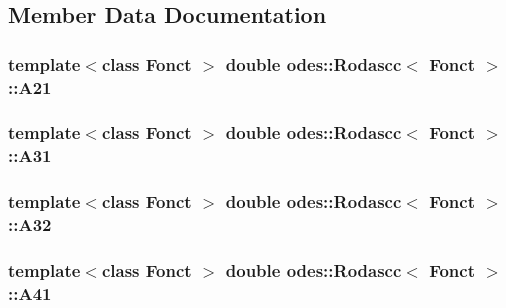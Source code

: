 \subsection{Member Data Documentation}
\hypertarget{classodes_1_1Rodascc_a4d691a75b627e591251a32608a6909df}{
\subsubsection[{A21}]{\setlength{\rightskip}{0pt plus 5cm}template$<$class Fonct $>$ double {\bf odes\-::\-Rodascc}$<$ Fonct $>$\-::A21\hspace{0.3cm}{\ttfamily [private]}}}\label{classodes_1_1Rodascc_a4d691a75b627e591251a32608a6909df}
\hypertarget{classodes_1_1Rodascc_a362aebc9995ecb57983aca35d05c89c1}{
\subsubsection[{A31}]{\setlength{\rightskip}{0pt plus 5cm}template$<$class Fonct $>$ double {\bf odes\-::\-Rodascc}$<$ Fonct $>$\-::A31\hspace{0.3cm}{\ttfamily [private]}}}\label{classodes_1_1Rodascc_a362aebc9995ecb57983aca35d05c89c1}
\hypertarget{classodes_1_1Rodascc_ac99ecd279f4ccef2420fdd22de1fd07e}{
\subsubsection[{A32}]{\setlength{\rightskip}{0pt plus 5cm}template$<$class Fonct $>$ double {\bf odes\-::\-Rodascc}$<$ Fonct $>$\-::A32\hspace{0.3cm}{\ttfamily [private]}}}\label{classodes_1_1Rodascc_ac99ecd279f4ccef2420fdd22de1fd07e}
\hypertarget{classodes_1_1Rodascc_a56c7326e1a6ada579e762688053f62b4}{
\subsubsection[{A41}]{\setlength{\rightskip}{0pt plus 5cm}template$<$class Fonct $>$ double {\bf odes\-::\-Rodascc}$<$ Fonct $>$\-::A41\hspace{0.3cm}{\ttfamily [private]}}}\label{classodes_1_1Rodascc_a56c7326e1a6ada579e762688053f62b4}
